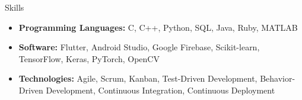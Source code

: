 \documentclass[]{../mcdowellcv}
\begin{document}
\begin{cvsection}{Skills}

    \begin{cvsubsection}{}{}{}
        \begin{itemize}
            \item \textbf{Programming Languages:} C, C++, Python, SQL, Java, Ruby, MATLAB
            \item \textbf{Software:} Flutter, Android Studio, Google Firebase, Scikit-learn, TensorFlow, Keras, PyTorch, OpenCV
            \item \textbf{Technologies:} Agile, Scrum, Kanban, Test-Driven Development, Behavior-Driven Development, Continuous Integration, Continuous Deployment
        \end{itemize}
    \end{cvsubsection}

\end{cvsection}
\end{document}

